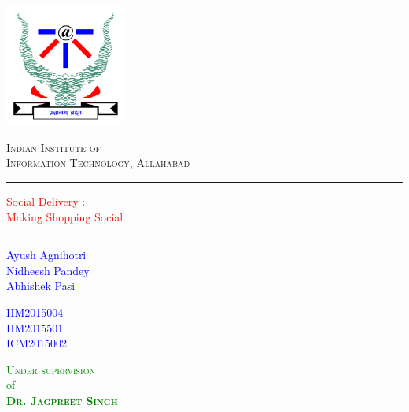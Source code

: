 \documentclass{report}
\begin{document}
 

\begin{titlepage}
	\centering
	\includegraphics[width=4cm]{logo.png}\\[.5cm]
	{\scshape\LARGE Indian Institute of \\Information Technology, Allahabad \par}
	\vspace{1cm}
	\rule{\textwidth}{2pt}	
	\vspace{0.15\textheight}
		
	\textcolor{Red}{ 
		{\fontsize{35}{52}\selectfont Social Delivery : \\[8pt] Making Shopping Social}\\[0.5\baselineskip]
	}
	
	\vspace{0.15\textheight} 
	\setlength\columnsep{0pt}
	\rule{0.3\textwidth}{0.4pt} 
	\begin{multicols}{3} 
	\textcolor{Blue}{
		\begin{flushleft} 
		{\large \quad \quad \quad \quad Ayush Agnihotri}\\[8pt] 
		{\large \quad \quad \quad \quad Nidheesh Pandey}\\[8pt]
		{\large \quad \quad \quad \quad Abhishek Pasi}\\[8pt]
		\end{flushleft}
		}
		\columnbreak
		 
	\textcolor{Blue}{
		\begin{flushleft} 
		{\large IIM2015004}\\[8pt] 
		{\large IIM2015501}\\[8pt]
		{\large ICM2015002}\\[8pt]
		\end{flushleft}
		}
		\columnbreak

	\textcolor{Green}{
		\begin{flushright}
		{\Large \textsc{Under supervision}}\\[8pt]
		{\large of}\\[8pt]
		{\Large \textsc{\textbf{Dr. Jagpreet Singh}}}\\[8pt]
		\end{flushright}
		}
	\end{multicols}
	\vspace{0.015\textheight} 
	

\end{titlepage}
\end{document}
